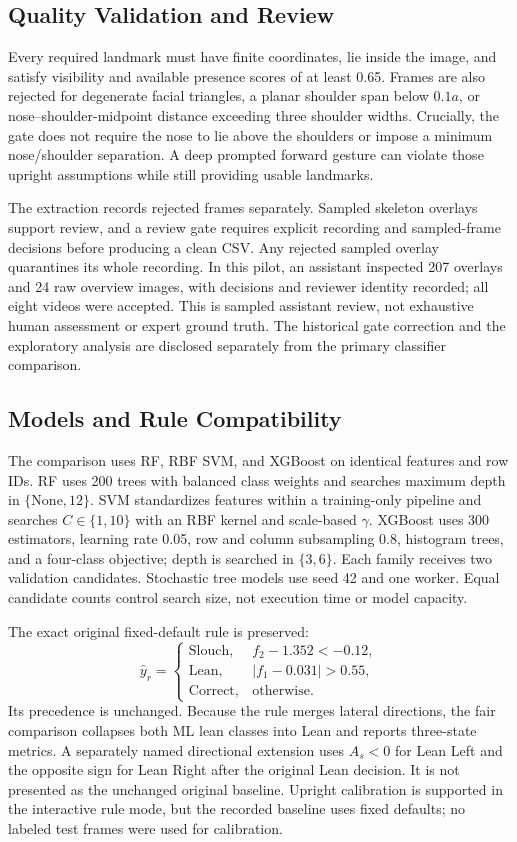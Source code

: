 \documentclass[conference]{IEEEtran}
\begin{document}
\subsection{Quality Validation and Review}
Every required landmark must have finite coordinates, lie inside the image, and satisfy visibility and available presence scores of at least 0.65. Frames are also rejected for degenerate facial triangles, a planar shoulder span below $0.1a$, or nose--shoulder-midpoint distance exceeding three shoulder widths. Crucially, the gate does not require the nose to lie above the shoulders or impose a minimum nose/shoulder separation. A deep prompted forward gesture can violate those upright assumptions while still providing usable landmarks.

The extraction records rejected frames separately. Sampled skeleton overlays support review, and a review gate requires explicit recording and sampled-frame decisions before producing a clean CSV. Any rejected sampled overlay quarantines its whole recording. In this pilot, an assistant inspected 207 overlays and 24 raw overview images, with decisions and reviewer identity recorded; all eight videos were accepted. This is sampled assistant review, not exhaustive human assessment or expert ground truth. The historical gate correction and the exploratory analysis are disclosed separately from the primary classifier comparison.

\subsection{Models and Rule Compatibility}
The comparison uses RF, RBF SVM, and XGBoost on identical features and row IDs. RF uses 200 trees with balanced class weights and searches maximum depth in $\{\mathrm{None},12\}$. SVM standardizes features within a training-only pipeline and searches $C\in\{1,10\}$ with an RBF kernel and scale-based $\gamma$. XGBoost uses 300 estimators, learning rate 0.05, row and column subsampling 0.8, histogram trees, and a four-class objective; depth is searched in $\{3,6\}$. Each family receives two validation candidates. Stochastic tree models use seed 42 and one worker. Equal candidate counts control search size, not execution time or model capacity.

The exact original fixed-default rule is preserved:
\begin{equation}
\hat y_r=\begin{cases}
\mathrm{Slouch},&f_2-1.352<-0.12,\\
\mathrm{Lean},&|f_1-0.031|>0.55,\\
\mathrm{Correct},&\text{otherwise}.
\end{cases}
\end{equation}
Its precedence is unchanged. Because the rule merges lateral directions, the fair comparison collapses both ML lean classes into Lean and reports three-state metrics. A separately named directional extension uses $A_s<0$ for Lean Left and the opposite sign for Lean Right after the original Lean decision. It is not presented as the unchanged original baseline. Upright calibration is supported in the interactive rule mode, but the recorded baseline uses fixed defaults; no labeled test frames were used for calibration.
\end{document}
